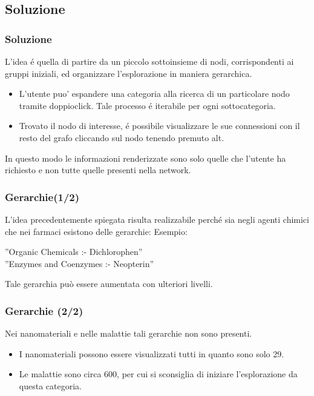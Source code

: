 \documentclass{beamer}
\begin{document}
\subsection{Soluzione}
\begin{frame}
\frametitle{Soluzione}
L'idea \'e quella di partire da un piccolo sottoinsieme di nodi, corrispondenti ai gruppi iniziali, ed organizzare l'esplorazione in maniera gerarchica. 
\begin{itemize}
\item L'utente puo' espandere una categoria alla ricerca di un particolare nodo tramite doppioclick. Tale processo \'e iterabile per ogni sottocategoria.
\item Trovato il nodo di interesse, \'e possibile visualizzare le sue connessioni con il resto del grafo cliccando sul nodo tenendo premuto alt.
\end{itemize}
\medskip
In questo modo le informazioni renderizzate sono solo quelle che l'utente ha richiesto e non tutte quelle presenti nella network. 
\end{frame}

\begin{frame}
\frametitle{Gerarchie(1/2)}
L'idea precedentemente spiegata risulta realizzabile perché sia negli agenti chimici che nei farmaci esistono delle gerarchie: Esempio:\\
\medskip
\begin{center}
''Organic Chemicals :- Dichlorophen''\\
''Enzymes and Coenzymes :- Neopterin''
\end{center}
Tale gerarchia può essere aumentata con ulteriori livelli. 
\end{frame}

\begin{frame}
\frametitle{Gerarchie (2/2)}
Nei nanomateriali e nelle malattie tali gerarchie non sono presenti.
\begin{itemize}
\item I nanomateriali possono essere visualizzati tutti in quanto sono solo 29.
\item Le malattie sono circa 600, per cui si sconsiglia di iniziare l'esplorazione da questa categoria.
\end{itemize}
\medskip
\end{frame}
\end{document}
